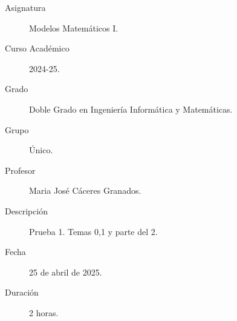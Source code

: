 \documentclass[12pt]{article}
\begin{document}

    
    

    \begin{description}
        \item[Asignatura] Modelos Matemáticos I.
        \item[Curso Académico] 2024-25.
        \item[Grado] Doble Grado en Ingeniería Informática y Matemáticas.
        \item[Grupo] Único.
        \item[Profesor] Maria José Cáceres Granados.
        \item[Descripción] Prueba 1. Temas 0,1 y parte del 2.
        \item[Fecha] 25 de abril de 2025.
        \item[Duración] 2 horas.
    
    \end{description}
    \newpage


    
\end{document}
